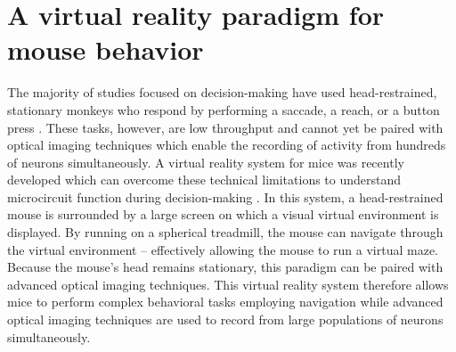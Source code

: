 \section{A virtual reality paradigm for mouse behavior} \label{intro:vr}

The majority of studies focused on decision-making have used head-restrained, stationary monkeys who respond by performing a saccade, a reach, or a button press \citep{Gold:2007fo, Bisley:2010ci, Freedman:2006hd, Freedman:2011hq, Buneo:2006gu}. These tasks, however, are low throughput and cannot yet be paired with optical imaging techniques which enable the recording of activity from hundreds of neurons simultaneously. A virtual reality system for mice was recently developed which can overcome these technical limitations to understand microcircuit function during decision-making \citep{Harvey:2009ci}. In this system, a head-restrained mouse is surrounded by a large screen on which a visual virtual environment is displayed. By running on a spherical treadmill, the mouse can navigate through the virtual environment – effectively allowing the mouse to run a virtual maze. Because the mouse’s head remains stationary, this paradigm can be paired with advanced optical imaging techniques. This virtual reality system therefore allows mice to perform complex behavioral tasks employing navigation while advanced optical imaging techniques are used to record from large populations of neurons simultaneously.
